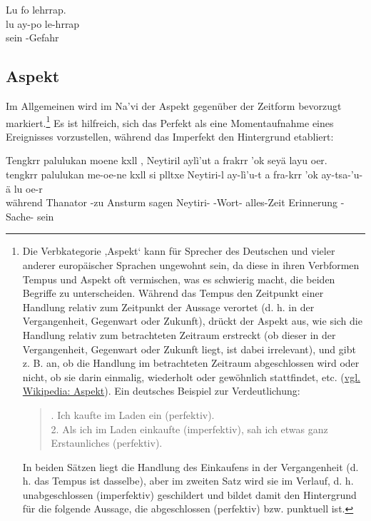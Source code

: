 \begin{interlin}
	\glll Lu fo lehrrap. \\
	lu ay-po le-hrrap \\
	sein  -Gefahr \\
\end{interlin}

\subsection{Aspekt} Im Allgemeinen wird im Na'vi der Aspekt gegenüber der Zeitform bevorzugt markiert.\footnote{Die Verbkategorie ,Aspekt‘ kann für Sprecher des Deutschen und vieler anderer europäischer Sprachen ungewohnt sein, da diese in ihren Verbformen Tempus und Aspekt oft vermischen, was es schwierig macht, die beiden Begriffe zu unterscheiden. Während das Tempus den Zeitpunkt einer Handlung relativ zum Zeitpunkt der Aussage verortet (d. h. in der Vergangenheit, Gegenwart oder Zukunft), drückt der Aspekt aus, wie sich die Handlung relativ zum betrachteten Zeitraum erstreckt (ob dieser in der Vergangenheit, Gegenwart oder Zukunft liegt, ist dabei irrelevant), und gibt z. B. an, ob die Handlung im betrachteten Zeitraum abgeschlossen wird oder nicht, ob sie darin einmalig, wiederholt oder gewöhnlich stattfindet, etc. (\href{https://de.wikipedia.org/wiki/Aspekt_(Linguistik)}{vgl. Wikipedia: Aspekt}). Ein deutsches Beispiel zur Verdeutlichung:
	\begin{quotation}
		. Ich kaufte im Laden ein  (perfektiv).\\
		2.  Als ich im Laden einkaufte (imperfektiv), sah ich etwas ganz Erstaunliches (perfektiv).
	\end{quotation}
	In beiden Sätzen liegt die Handlung des Einkaufens in der Vergangenheit (d. h. das Tempus ist dasselbe), aber im zweiten Satz wird sie im Verlauf, d. h. unabgeschlossen (imperfektiv) geschildert und bildet damit den Hintergrund für die folgende Aussage, die abgeschlossen (perfektiv) bzw. punktuell ist.} Es ist hilfreich, sich das Perfekt als eine Momentaufnahme eines Ereignisses vorzustellen, während das Imperfekt den Hintergrund etabliert:
	
	\begin{interlin}
		\glll \Npawl{}Tengkrr palulukan moene kxll ,  Neytiril aylì'ut a frakrr 'ok seyä layu oer. \\
		tengkrr palulukan me-oe-ne kxll si plltxe Neytiri-l ay-lì'u-t a fra-krr 'ok ay-tsa-'u-ä lu oe-r \\
		während Thanator -zu Ansturm  sagen Neytiri- -Wort-  alles-Zeit Erinnerung -Sache- sein  \\
	\end{interlin}

